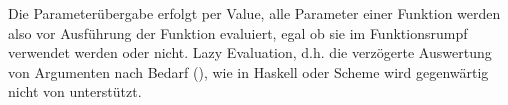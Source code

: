Die Parameterübergabe erfolgt per Value, alle Parameter einer Funktion werden also vor Ausführung der Funktion evaluiert, egal ob sie im Funktionsrumpf verwendet werden oder nicht. Lazy Evaluation, d.h. die verzögerte Auswertung von Argumenten nach Bedarf (\cite[64]{wilhelm_uebersetzerbau_2007}), wie in Haskell oder Scheme wird gegenwärtig nicht von \projectname{} unterstützt.

